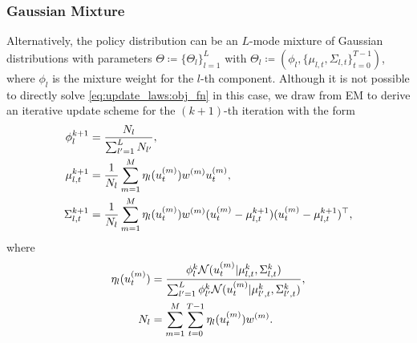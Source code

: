 \documentclass[twoside,11pt]{article}
\begin{document}
\subsubsection{Gaussian Mixture} Alternatively, the policy distribution can be an $L$-mode mixture of Gaussian distributions with parameters $\Theta \coloneqq \{ \Theta_l \}_{l=1}^{L}$ with $\Theta_l \coloneqq (\phi_l, \{ \mu_{l, t}, \Sigma_{l, t} \}_{t=0}^{T-1})$, where $\phi_l$ is the mixture weight for the $l$-th component.
Although it is not possible to directly solve \cref{eq:update_laws:obj_fn} in this case, we draw from \ac{EM} to derive an iterative update scheme for the $(k+1)$-th iteration with the form
\begin{subequations}
\begin{align}
\phi_l^{k+1} &= \frac{N_l}{\sum_{l'=1}^L N_{l'}},\\
\mu_{l,t}^{k+1} &= \frac{1}{N_l}\sum_{m=1}^M \eta_l(u_t^{(m)}) w^{(m)} u_t^{(m)},\\
\Sigma_{l,t}^{k+1} &= \frac{1}{N_l}\sum_{m=1}^M \eta_l(u_t^{(m)}) w^{(m)} (u^{(m)}_t-\mu_{l,t}^{k+1})(u^{(m)}_t-\mu_{l,t}^{k+1})^\top,
\end{align}
\end{subequations}
where
\begin{align*}
\eta_l(u_t^{(m)}) &= \frac{\phi_l^k{\cal N}(u_t^{(m)}|\mu_{l,t}^k, \Sigma_{l,t}^k)}{\sum_{l'=1}^L \phi_{l'}^k {\cal N}(u_t^{(m)} | \mu_{l',t}^k, \Sigma_{l',t}^k)},\\
N_{l} &= \sum_{m=1}^M \sum_{t=0}^{T-1} \eta_l(u_t^{(m)}) w^{(m)}.
\end{align*}
\end{document}
